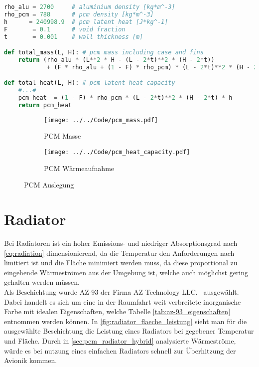 \begin{lstlisting}[language=Python, caption={Berechnung der Masse und Latenten Wärmekapazität des \ac{pcm} in der pcm.py}, label={lst:pcm_masse_kapazität}]
rho_alu = 2700     # aluminium density [kg*m^-3]
rho_pcm = 788      # pcm density [kg*m^-3]
h      = 240998.9  # pcm latent heat [J*kg^-1]
F       = 0.1      # void fraction
t       = 0.001    # wall thickness [m]

def total_mass(L, H): # pcm mass including case and fins
    return (rho_alu * (L**2 * H - (L - 2*t)**2 * (H - 2*t))
            + (F * rho_alu + (1 - F) * rho_pcm) * (L - 2*t)**2 * (H - 2*t)) 

def total_heat(L, H): # pcm latent heat capacity
    #...#
    pcm_heat  = (1 - F) * rho_pcm * (L - 2*t)**2 * (H - 2*t) * h
    return pcm_heat
\end{lstlisting}

\begin{figure}[H]
    \centering
    \begin{subfigure}{0.9\textwidth}
        \centering
        \texttt{[image: ../../Code/pcm\_mass.pdf]}
        \caption{PCM Masse}\label{fig:pcm_mass}
    \end{subfigure}
    \vspace{1em}  %
    \begin{subfigure}{0.9\textwidth}
        \centering
        \texttt{[image: ../../Code/pcm\_heat\_capacity.pdf]}
        \caption{PCM Wärmeaufnahme}\label{fig:pcm_heat}
    \end{subfigure}
    \caption{PCM Auslegung}\label{fig:pcm_mass_heat}
\end{figure}

\newpage

\section{Radiator}\label{sec:Radiator}

Bei Radiatoren ist ein hoher Emissions- und niedriger Absorptionsgrad nach \ref{eq:radiation} dimensionierend, da die Temperatur den Anforderungen nach limitiert ist
und die Fläche minimiert werden muss, da diese proportional zu eingehende Wärmeströmen aus der Umgebung ist, welche auch möglichst gering gehalten werden müssen.\\
Als Beschichtung wurde AZ-93 der Firma AZ Technology LLC.~\cite{AZ-Technology} ausgewählt. Dabei handelt es sich um eine in der Raumfahrt
weit verbreitete inorganische Farbe mit idealen Eigenschaften, welche Tabelle \ref{tab:az-93_eigenschaften} entnommen werden können.
In \ref{fig:radiator_flaeche_leistung} sieht man für die ausgewählte Beschichtung die Leistung eines Radiators bei gegebener Temperatur und Fläche.
Durch in \ref{sec:pcm_radiator_hybrid} analysierte Wärmeströme, würde es bei nutzung eines einfachen Radiators schnell zur Überhitzung der Avionik kommen.\\


